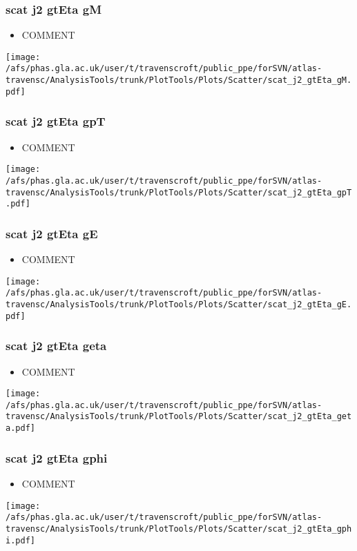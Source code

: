 \documentclass{beamer}
\begin{document}
\begin{frame}
\frametitle{scat j2 gtEta gM}
\begin{itemize}
\item COMMENT
\end{itemize}
\begin{center}
\texttt{[image: /afs/phas.gla.ac.uk/user/t/travenscroft/public\_ppe/forSVN/atlas-travensc/AnalysisTools/trunk/PlotTools/Plots/Scatter/scat\_j2\_gtEta\_gM.pdf]}
\end{center}
\end{frame}

\begin{frame}
\frametitle{scat j2 gtEta gpT}
\begin{itemize}
\item COMMENT
\end{itemize}
\begin{center}
\texttt{[image: /afs/phas.gla.ac.uk/user/t/travenscroft/public\_ppe/forSVN/atlas-travensc/AnalysisTools/trunk/PlotTools/Plots/Scatter/scat\_j2\_gtEta\_gpT.pdf]}
\end{center}
\end{frame}

\begin{frame}
\frametitle{scat j2 gtEta gE}
\begin{itemize}
\item COMMENT
\end{itemize}
\begin{center}
\texttt{[image: /afs/phas.gla.ac.uk/user/t/travenscroft/public\_ppe/forSVN/atlas-travensc/AnalysisTools/trunk/PlotTools/Plots/Scatter/scat\_j2\_gtEta\_gE.pdf]}
\end{center}
\end{frame}

\begin{frame}
\frametitle{scat j2 gtEta geta}
\begin{itemize}
\item COMMENT
\end{itemize}
\begin{center}
\texttt{[image: /afs/phas.gla.ac.uk/user/t/travenscroft/public\_ppe/forSVN/atlas-travensc/AnalysisTools/trunk/PlotTools/Plots/Scatter/scat\_j2\_gtEta\_geta.pdf]}
\end{center}
\end{frame}

\begin{frame}
\frametitle{scat j2 gtEta gphi}
\begin{itemize}
\item COMMENT
\end{itemize}
\begin{center}
\texttt{[image: /afs/phas.gla.ac.uk/user/t/travenscroft/public\_ppe/forSVN/atlas-travensc/AnalysisTools/trunk/PlotTools/Plots/Scatter/scat\_j2\_gtEta\_gphi.pdf]}
\end{center}
\end{frame}
\end{document}
